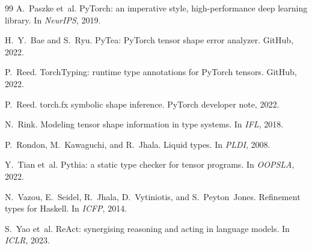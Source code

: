 \documentclass{article}
\theoremstyle{plain}
\theoremstyle{definition}
\begin{document}
\begin{thebibliography}{99}
A.~Paszke et~al.
\newblock PyTorch: an imperative style, high-performance deep
  learning library.
\newblock In \emph{NeurIPS}, 2019.

H.~Y.~Bae and S.~Ryu.
\newblock PyTea: PyTorch tensor shape error analyzer.
\newblock GitHub, 2022.

P.~Reed.
\newblock TorchTyping: runtime type annotations for PyTorch tensors.
\newblock GitHub, 2022.

P.~Reed.
\newblock torch.fx symbolic shape inference.
\newblock PyTorch developer note, 2022.

N.~Rink.
\newblock Modeling tensor shape information in type systems.
\newblock In \emph{IFL}, 2018.

P.~Rondon, M.~Kawaguchi, and R.~Jhala.
\newblock Liquid types.
\newblock In \emph{PLDI}, 2008.

Y.~Tian et~al.
\newblock Pythia: a static type checker for tensor programs.
\newblock In \emph{OOPSLA}, 2022.

N.~Vazou, E.~Seidel, R.~Jhala, D.~Vytiniotis, and S.~Peyton~Jones.
\newblock Refinement types for Haskell.
\newblock In \emph{ICFP}, 2014.

S.~Yao et~al.
\newblock ReAct: synergising reasoning and acting in language
  models.
\newblock In \emph{ICLR}, 2023.

\end{thebibliography}
\end{document}
